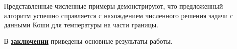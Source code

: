 Представленные численные примеры демонстрируют, что предложенный
алгоритм успешно справляется с нахождением численного решения задачи
с данными Коши для температуры на части границы.

\FloatBarrier
{}                                  %
В \underline{\textbf{заключении}} приведены основные результаты работы.


